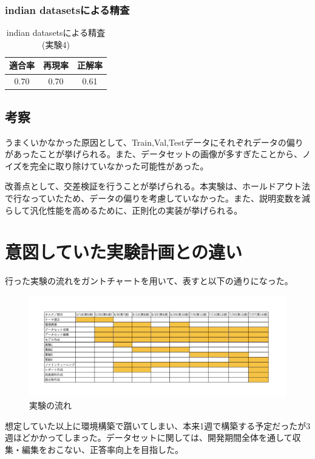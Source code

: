 \documentclass[a4paper, 11pt, titlepage]{jsarticle}
\begin{document}
\subsubsection{indian datasetsによる精査}
\begin{table}[htb]
\centering
  \caption{indian datasetsによる精査(実験4)}
  \begin{tabular}{|c|c|c|}  \hline
    適合率 & 再現率 & 正解率 \\ \hline
    0.70 & 0.70 & 0.61 \\ \hline
  \end{tabular}
\end{table}

\subsection{考察}
うまくいかなかった原因として、Train,Val,Testデータにそれぞれデータの偏りがあったことが挙げられる。また、データセットの画像が多すぎたことから、ノイズを完全に取り除けていなかった可能性があった。\par
改善点として、交差検証を行うことが挙げられる。本実験は、ホールドアウト法で行なっていたため、データの偏りを考慮していなかった。また、説明変数を減らして汎化性能を高めるために、正則化の実装が挙げられる\cite{theme6}。

\clearpage

\section{意図していた実験計画との違い}
行った実験の流れをガントチャートを用いて、表すと以下の通りになった。\par
\begin{figure}[htbp]
\begin{center}
\includegraphics[width=150mm]{G2_Ganttchart.jpeg}
\caption{実験の流れ}
\end{center}
\end{figure}
想定していた以上に環境構築で躓いてしまい、本来1週で構築する予定だったが3週ほどかかってしまった。データセットに関しては、開発期間全体を通して収集・編集をおこない、正答率向上を目指した。
\end{document}
